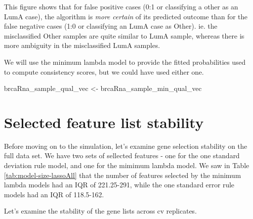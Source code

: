 \documentclass[
]{book}
\newenvironment{Shaded}{\begin{snugshade}}{\end{snugshade}}
\newcommand{\NormalTok}[1]{#1}
\newcommand{\StringTok}[1]{\textcolor[rgb]{0.31,0.60,0.02}{#1}}
\begin{document}
This figure shows that for false positive cases (0:1 or classifying a
other as an LumA case), the algorithm is \emph{more certain} of its predicted
outcome than for the false negative cases (1:0 or classifying an LumA case as Other).
ie. the misclassified Other samples are quite similar to LumA sample, whereas there
is more ambiguity in the misclassified LumA samples.

We will use the minimum lambda model to provide
the fitted probabilities used to compute consistency scores,
but we could have used either one.

\begin{Shaded}
\begin{Highlighting}[]
\NormalTok{brcaRna\_sample\_qual\_vec <{-}}\StringTok{ }\NormalTok{brcaRna\_sample\_min\_qual\_vec}
\end{Highlighting}
\end{Shaded}

\hypertarget{selected-feature-list-stability-1}{%
\section{Selected feature list stability}\label{selected-feature-list-stability-1}}

Before moving on to the simulation, let's examine gene selection stability on the
full data set. We have two sets of sellected features - one for the
one standard deviation rule model, and one for the mimimum lambda model.
We saw in Table \ref{tab:model-size-lassoAll} that the number of features
selected by the minimum lambda models had an IQR of
221.25-291,
while the one standard error rule models had an IQR of
118.5-162.

Let's examine the stability of the gene lists across cv replicates.
\end{document}
